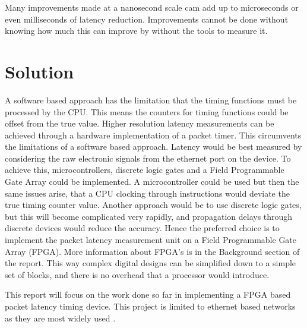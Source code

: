Many improvements made at a nanosecond scale cam add up to microseconds or even milliseconds of latency
reduction. Improvements cannot be done without knowing how much this can improve by without the tools to measure it.

\section{Solution}

\par A software based approach has the limitation that the timing functions must be processed by the
CPU. This means the counters for timing functions could be offset from the true value. Higher
resolution latency measurements can be achieved through a hardware implementation of a packet
timer. This circumvents the limitations of a software based approach.
Latency would be best measured by considering the raw electronic signals from the ethernet port on
the device. To achieve this, microcontrollers, discrete logic gates and a Field Programmable Gate
Array could be implemented. A microcontroller could be used but then the same issues arise, that a
CPU clocking through instructions would deviate the true timing counter value. Another approach
would be to use discrete logic gates, but this will become complicated very rapidly, and propagation
delays through discrete devices would reduce the accuracy. Hence the preferred choice is to
implement the packet latency measurement unit on a Field Programmable Gate Array (FPGA). More
information about FPGA’s is in the Background section of the report. This way complex digital
designs can be simplified down to a simple set of blocks, and there is no overhead that a processor
would introduce.

\par This report will focus on the work done so far in implementing a FPGA based packet latency timing
device. This project is limited to ethernet based networks as they are most widely used \cite{etherneteverywhere}.
